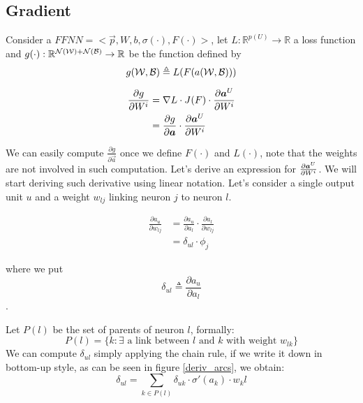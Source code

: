 \subsection{Gradient}
Consider a $FFNN=<\vec{p},W,b,\sigma(\cdot),F(\cdot)>$, let $L:\mathbb{R}^{p(U)} \rightarrow \mathbb{R}$ a loss function and 
$g(\cdot):\mathbb{R}^{\mathcal{N}(\mathcal{W})+\mathcal{N}(\mathcal{B})} \rightarrow \mathbb{R}$ be the function defined by
$$g(\mathcal{W},\mathcal{B}) \triangleq L(F(a(\mathcal{W},\mathcal{B})))$$


\begin{align}
\frac{\partial g}{\partial W^i} &= \nabla L \cdot J(F) \cdot \frac{\partial \boldsymbol{a}^U}{\partial W^i}\\
&= \frac{\partial g}{\partial \boldsymbol{a}} \cdot \frac{\partial \boldsymbol{a}^U}{\partial W^i}
\end{align}


We can easily compute $\frac{\partial g}{\partial \vec{a}}$ once we define $F(\cdot)$ and $L(\cdot)$, note that the weights are not involved in such computation.
Let's derive an expression for $\frac{\partial \boldsymbol{a}^U}{\partial W^i}$.
We will start deriving such derivative using linear notation. Let's consider a single output unit $u$ and a weight $w_{lj}$ linking neuron $j$ to neuron $l$.


\begin{align}
\frac{\partial a_u}{\partial w_{lj}} &= \frac{\partial a_u}{\partial a_l} \cdot \frac{\partial a_l}{\partial w_{lj}}\\
&=\delta_{ul} \cdot \phi_j
\end{align}

where we put $$\delta_{ul} \triangleq \frac{\partial a_u}{\partial a_l}$$.

Let $P(l)$ be the set of parents of neuron $l$, formally:
\begin{equation} 
P(l) = \{ k: \exists \text{ a link between $l$ and $k$ with weight } w_{lk} \}
\end{equation}
We can compute $\delta_{ul}$ simply applying the chain rule, if we write it down in bottom-up style, as can be seen in figure \ref{deriv_arcs}, we obtain:
\begin{equation}
\delta_{ul} = \sum_{k\in P(l)} \delta_{uk} \cdot \sigma'(a_k)\cdot w_kl
\end{equation}

